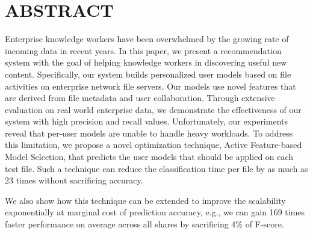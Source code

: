 

\section{ABSTRACT}        %
  Enterprise knowledge workers have been overwhelmed by the growing
  rate of incoming data in recent years.  In this paper, we present a
  recommendation system with the goal of helping knowledge workers in
  discovering useful new content.  Specifically, our system builds
  personalized user models based on file activities on enterprise
  network file servers.  Our models use novel features that are
  derived from file metadata and user collaboration.  Through
  extensive evaluation on real world enterprise data, we demonstrate
  the effectiveness of our system with high precision and recall
  values.  Unfortunately, our experiments reveal that per-user models
  are unable to handle heavy workloads.  To address this
  limitation, we propose a novel optimization technique, Active
  Feature-based Model Selection, that predicts the user models that 
should be applied on each test file. Such a technique can reduce the 
classification time per file by as much as 23 times without sacrificing accuracy. 

  We also show how this technique can be extended to improve the
  scalability exponentially at marginal cost of prediction accuracy, e.g., we can 
 gain 169 times faster performance on average across all shares by sacrificing 4\%
  of F-score.



 

 
% 



